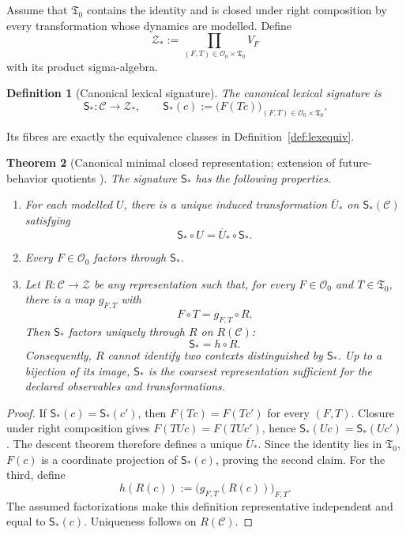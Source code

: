 \documentclass[11pt]{article}
\newtheorem{definition}{Definition}[section]
\newtheorem{theorem}[definition]{Theorem}
\newcommand{\Ctxt}{\mathcal C}
\newcommand{\Trans}{\mathfrak T}
\begin{document}
Assume that $\Trans_0$ contains the identity and is closed under right composition by every transformation whose dynamics are modelled. Define
\[
 \mathcal Z_*:=\prod_{(F,T)\in\mathcal O_0\times\Trans_0}V_F
\]
with its product sigma-algebra.

\begin{definition}[Canonical lexical signature]\label{def:signature}
The canonical lexical signature is
\[
 \mathsf S_*:\Ctxt\longrightarrow\mathcal Z_*,
 \qquad
 \mathsf S_*(c):=\bigl(F(Tc)\bigr)_{(F,T)\in\mathcal O_0\times\Trans_0}.
\]
\end{definition}

Its fibres are exactly the equivalence classes in Definition~\ref{def:lexequiv}.

\begin{theorem}[Canonical minimal closed representation; extension of future-behavior quotients \cite{nerode1958,rutten2000}]\label{thm:canonical}
The signature $\mathsf S_*$ has the following properties.
\begin{enumerate}
\item For each modelled $U$, there is a unique induced transformation $\overline U_*$ on $\mathsf S_*(\Ctxt)$ satisfying
\[
 \mathsf S_*\circ U=\overline U_*\circ\mathsf S_*.
\]
\item Every $F\in\mathcal O_0$ factors through $\mathsf S_*$.
\item Let $R:\Ctxt\to\mathcal Z$ be any representation such that, for every $F\in\mathcal O_0$ and $T\in\Trans_0$, there is a map $g_{F,T}$ with
\[
 F\circ T=g_{F,T}\circ R.
\]
Then $\mathsf S_*$ factors uniquely through $R$ on $R(\Ctxt)$:
\[
 \mathsf S_*=h\circ R.
\]
Consequently, $R$ cannot identify two contexts distinguished by $\mathsf S_*$. Up to a bijection of its image, $\mathsf S_*$ is the coarsest representation sufficient for the declared observables and transformations.
\end{enumerate}
\end{theorem}

\begin{proof}
If $\mathsf S_*(c)=\mathsf S_*(c')$, then $F(Tc)=F(Tc')$ for every $(F,T)$. Closure under right composition gives $F(TUc)=F(TUc')$, hence $\mathsf S_*(Uc)=\mathsf S_*(Uc')$. The descent theorem therefore defines a unique $\overline U_*$. Since the identity lies in $\Trans_0$, $F(c)$ is a coordinate projection of $\mathsf S_*(c)$, proving the second claim. For the third, define
\[
 h(R(c)):=\bigl(g_{F,T}(R(c))\bigr)_{F,T}.
\]
The assumed factorizations make this definition representative independent and equal to $\mathsf S_*(c)$. Uniqueness follows on $R(\Ctxt)$.
\end{proof}
\end{document}
